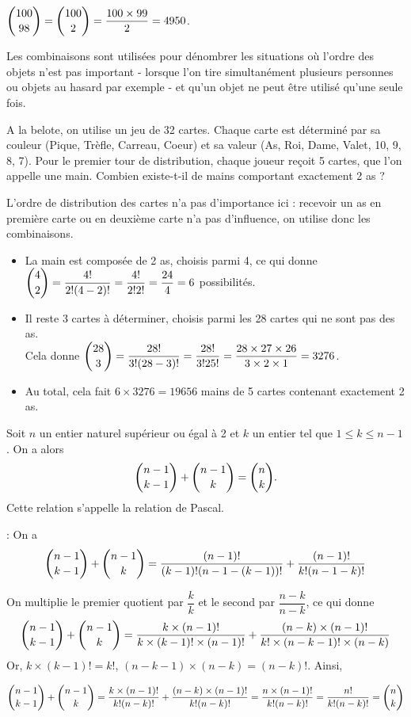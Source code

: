 \documentclass[11pt,fleqn, openany]{book} %
\begin{document}
\begin{example} $\dbinom{100}{98}=\dbinom{100}{2}=\dfrac{100 \times 99}{2}= 4950$.\end{example}



\begin{proposition}Les combinaisons sont utilisées pour dénombrer les situations où l'ordre des objets n'est pas important - lorsque l'on tire simultanément plusieurs personnes ou objets au hasard par exemple - et qu'un objet ne peut être utilisé qu'une seule fois.\end{proposition}

\begin{example} A la belote, on utilise un jeu de 32 cartes. Chaque carte est déterminé par sa couleur (Pique, Trèfle, Carreau, Coeur) et sa valeur (As, Roi, Dame, Valet, 10, 9, 8, 7). Pour le premier tour de distribution, chaque joueur reçoit 5 cartes, que l'on appelle une main. Combien existe-t-il de mains comportant exactement 2 as ?

L'ordre de distribution des cartes n'a pas d'importance ici : recevoir un as en première carte ou en deuxième carte n'a pas d'influence, on utilise donc les combinaisons.
\begin{itemize}
\item La main est composée de 2 as, choisis parmi 4, ce qui donne $\dbinom{4}{2}=\dfrac{4!}{2!(4-2)!}=\dfrac{4!}{2!2!}=\dfrac{24}{4}=6$ possibilités.
\item Il reste 3 cartes à déterminer, choisis parmi les 28 cartes qui ne sont pas des as. \\
Cela donne $\dbinom{28}{3}=\dfrac{28!}{3!(28-3)!}=\dfrac{28!}{3!25!}=\dfrac{28\times 27 \times 26}{3 \times 2 \times 1}=3276$.
\item Au total, cela fait $6\times 3276 =19656$ mains de 5 cartes contenant exactement 2 as.
\end{itemize}\end{example}



\begin{proposition}Soit $n$ un entier naturel supérieur ou égal à 2 et $k$ un entier tel que $1\leqslant k\leqslant n-1$. On a alors
\[ \dbinom{n-1}{k-1}+\dbinom{n-1}{k} = \dbinom{n}{k}.\]
Cette relation s'appelle la relation de Pascal.\end{proposition}

\begin{demonstration} : On a
\[ \dbinom{n-1}{k-1}+\dbinom{n-1}{k}=\dfrac{(n-1)!}{(k-1)!(n-1-(k-1))!}+\dfrac{(n-1)!}{k!(n-1-k)!}\]

On multiplie le premier quotient par $\dfrac{k}{k}$ et le second par $\dfrac{n-k}{n-k}$, ce qui donne
\[\dbinom{n-1}{k-1}+\dbinom{n-1}{k}=\dfrac{k \times (n-1)!}{k\times (k-1)! \times (n-1)!}+\dfrac{(n-k) \times (n-1)!}{k! \times (n-k-1)! \times (n-k)}\]
Or, $k\times (k-1)!=k!$, $(n-k-1) \times (n-k)=(n-k)!$. Ainsi,

\[\dbinom{n-1}{k-1}+\dbinom{n-1}{k} = \dfrac{k \times (n-1)!}{k!(n-k)!}+\dfrac{(n-k) \times (n-1)!}{k!(n-k)!}=\dfrac{n \times (n-1)!}{k! (n-k)!}=\dfrac{n!}{k!(n-k)!}=\dbinom{n}{k}\]\end{demonstration}
\end{document}
